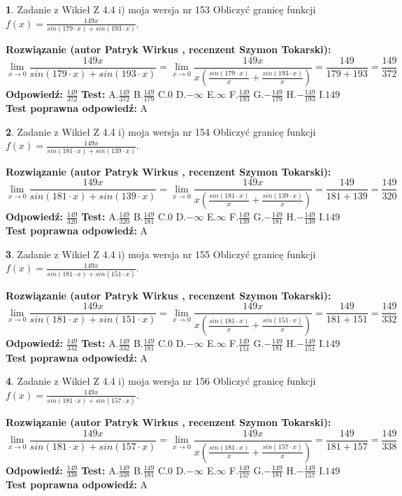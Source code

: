 \documentclass[12pt, a4paper]{article}
\theoremstyle{definition} %
\newtheorem{zad}{}
\newcommand{\zadStart}[1]{\begin{zad}#1\newline}
\newcommand{\zadStop}{\end{zad}}
\newcommand{\rozwStart}[2]{\noindent \textbf{Rozwiązanie (autor #1 , recenzent #2): }\newline}
\newcommand{\rozwStop}{\newline}
\newcommand{\odpStart}{\noindent \textbf{Odpowiedź:}\newline}
\newcommand{\odpStop}{\newline}
\newcommand{\testStart}{\noindent \textbf{Test:}\newline}
\newcommand{\testStop}{\newline}
\newcommand{\kluczStart}{\noindent \textbf{Test poprawna odpowiedź:}\newline}
\newcommand{\kluczStop}{\newline}
\begin{document}
\zadStart{Zadanie z Wikieł Z 4.4 i) moja wersja nr 153}
Obliczyć granicę funkcji $f(x)=\frac{149x}{sin(179\cdot x) +sin(193\cdot x)}$.
\zadStop
\rozwStart{Patryk Wirkus}{Szymon Tokarski}
$$\lim\limits_{x\to 0}\frac{149x}{sin(179\cdot x) +sin(193\cdot x)}=\lim\limits_{x\to 0}\frac{149x}{x(\frac{sin(179\cdot x)}{x}+\frac{sin(193\cdot x)}{x})}=\frac{149}{179+193} = \frac{149}{372}$$
\rozwStop
\odpStart
$\frac{149}{372}$
\odpStop
\testStart
A.$\frac{149}{372}$
B.$\frac{149}{179}$
C.$0$
D.$-\infty$
E.$\infty$
F.$\frac{149}{193}$
G.$-\frac{149}{179}$
H.$-\frac{149}{193}$
I.$149$
\testStop
\kluczStart
A
\kluczStop



\zadStart{Zadanie z Wikieł Z 4.4 i) moja wersja nr 154}
Obliczyć granicę funkcji $f(x)=\frac{149x}{sin(181\cdot x) +sin(139\cdot x)}$.
\zadStop
\rozwStart{Patryk Wirkus}{Szymon Tokarski}
$$\lim\limits_{x\to 0}\frac{149x}{sin(181\cdot x) +sin(139\cdot x)}=\lim\limits_{x\to 0}\frac{149x}{x(\frac{sin(181\cdot x)}{x}+\frac{sin(139\cdot x)}{x})}=\frac{149}{181+139} = \frac{149}{320}$$
\rozwStop
\odpStart
$\frac{149}{320}$
\odpStop
\testStart
A.$\frac{149}{320}$
B.$\frac{149}{181}$
C.$0$
D.$-\infty$
E.$\infty$
F.$\frac{149}{139}$
G.$-\frac{149}{181}$
H.$-\frac{149}{139}$
I.$149$
\testStop
\kluczStart
A
\kluczStop



\zadStart{Zadanie z Wikieł Z 4.4 i) moja wersja nr 155}
Obliczyć granicę funkcji $f(x)=\frac{149x}{sin(181\cdot x) +sin(151\cdot x)}$.
\zadStop
\rozwStart{Patryk Wirkus}{Szymon Tokarski}
$$\lim\limits_{x\to 0}\frac{149x}{sin(181\cdot x) +sin(151\cdot x)}=\lim\limits_{x\to 0}\frac{149x}{x(\frac{sin(181\cdot x)}{x}+\frac{sin(151\cdot x)}{x})}=\frac{149}{181+151} = \frac{149}{332}$$
\rozwStop
\odpStart
$\frac{149}{332}$
\odpStop
\testStart
A.$\frac{149}{332}$
B.$\frac{149}{181}$
C.$0$
D.$-\infty$
E.$\infty$
F.$\frac{149}{151}$
G.$-\frac{149}{181}$
H.$-\frac{149}{151}$
I.$149$
\testStop
\kluczStart
A
\kluczStop



\zadStart{Zadanie z Wikieł Z 4.4 i) moja wersja nr 156}
Obliczyć granicę funkcji $f(x)=\frac{149x}{sin(181\cdot x) +sin(157\cdot x)}$.
\zadStop
\rozwStart{Patryk Wirkus}{Szymon Tokarski}
$$\lim\limits_{x\to 0}\frac{149x}{sin(181\cdot x) +sin(157\cdot x)}=\lim\limits_{x\to 0}\frac{149x}{x(\frac{sin(181\cdot x)}{x}+\frac{sin(157\cdot x)}{x})}=\frac{149}{181+157} = \frac{149}{338}$$
\rozwStop
\odpStart
$\frac{149}{338}$
\odpStop
\testStart
A.$\frac{149}{338}$
B.$\frac{149}{181}$
C.$0$
D.$-\infty$
E.$\infty$
F.$\frac{149}{157}$
G.$-\frac{149}{181}$
H.$-\frac{149}{157}$
I.$149$
\testStop
\kluczStart
A
\kluczStop
\end{document}
